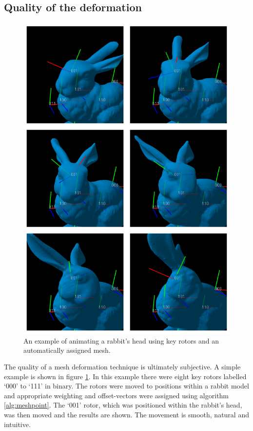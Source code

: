 \subsection{Quality of the deformation}

\begin{figure}[p]
\centering
\includegraphics[height=0.8\textheight]{mesh_example}
\caption{\label{fig:meshexample}An example of animating a rabbit's head using key rotors and an automatically
  assigned mesh.}
\end{figure}

The quality of a mesh deformation technique is ultimately subjective. A simple
example is shown in figure \ref{fig:meshexample}. In this example there were
eight key rotors labelled `000' to `111' in binary. The rotors were moved to
positions within a rabbit model and appropriate weighting and offset-vectors
were assigned using algorithm \ref{alg:meshpoint}. The `001' rotor, which was
positioned within the rabbit's head, was then moved and the results are shown.
The movement is smooth, natural and intuitive.

